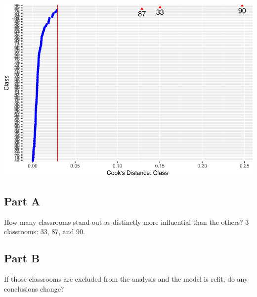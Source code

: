 \documentclass[]{article}
\begin{document}
\includegraphics{Beck_HW_5_R_1_files/figure-latex/unnamed-chunk-25-1.pdf}

\subsection{Part A}\label{part-a-5}

How many classrooms stand out as distinctly more influential than the
others? 3 classrooms: 33, 87, and 90.

\subsection{Part B}\label{part-b-5}

If those classrooms are excluded from the analysis and the model is
refit, do any conclusions change?
\end{document}
